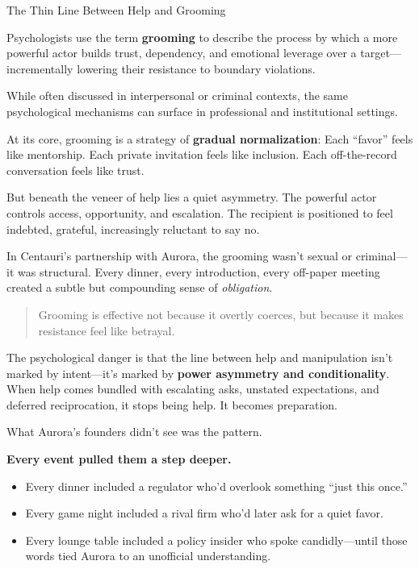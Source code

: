 \begin{PsychologySidebar}{The Thin Line Between Help and Grooming}

  Psychologists use the term \textbf{grooming} to describe the process by which a more powerful actor builds trust, dependency, and emotional leverage over a target—incrementally lowering their resistance to boundary violations.

  \medskip
  
  While often discussed in interpersonal or criminal contexts, the same psychological mechanisms can surface in professional and institutional settings.

  \medskip
  
  At its core, grooming is a strategy of \textbf{gradual normalization}:  
  Each “favor” feels like mentorship.  
  Each private invitation feels like inclusion.  
  Each off-the-record conversation feels like trust.

  \medskip
  
  But beneath the veneer of help lies a quiet asymmetry. The powerful actor controls access, opportunity, and escalation. The recipient is positioned to feel indebted, grateful, increasingly reluctant to say no.

  \medskip
  
  In Centauri’s partnership with Aurora, the grooming wasn’t sexual or criminal—it was structural. Every dinner, every introduction, every off-paper meeting created a subtle but compounding sense of \emph{obligation}.
  
  \begin{quote}
  Grooming is effective not because it overtly coerces,  
  but because it makes resistance feel like betrayal.
  \end{quote}
  
  The psychological danger is that the line between help and manipulation isn’t marked by intent—it’s marked by \textbf{power asymmetry and conditionality}.  
  When help comes bundled with escalating asks, unstated expectations, and deferred reciprocation, it stops being help.  
  It becomes preparation.
  
\end{PsychologySidebar}

  \medskip

What Aurora’s founders didn’t see was the pattern.

\textbf{Every event pulled them a step deeper.}

\begin{itemize}
  \item Every dinner included a regulator who’d overlook something “just this once.”  
  \item Every game night included a rival firm who’d later ask for a quiet favor.  
  \item Every lounge table included a policy insider who spoke candidly—until those words tied Aurora to an unofficial understanding.
\end{itemize}

